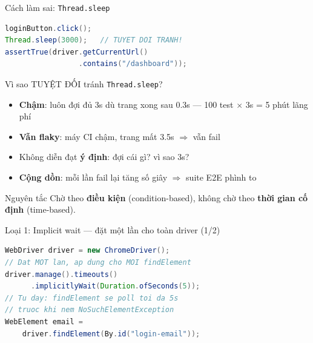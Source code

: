 \documentclass[aspectratio=169,12pt]{beamer}
\begin{document}
\begin{frame}[fragile]{Cách làm sai: \texttt{Thread.sleep}}
\begin{lstlisting}[language=Java]
loginButton.click();
Thread.sleep(3000);   // TUYET DOI TRANH!
assertTrue(driver.getCurrentUrl()
                 .contains("/dashboard"));
\end{lstlisting}

  \begin{alertblock}{Vì sao TUYỆT ĐỐI tránh \texttt{Thread.sleep}?}
    \small
    \begin{itemize}
      \item \textbf{Chậm}: luôn đợi đủ 3s dù trang xong sau 0.3s
            --- 100 test $\times$ 3s = 5 phút lãng phí
      \item \textbf{Vẫn flaky}: máy CI chậm, trang mất 3.5s
            $\Rightarrow$ vẫn fail
      \item Không diễn đạt \textbf{ý định}: đợi cái gì? vì sao 3s?
      \item \textbf{Cộng dồn}: mỗi lần fail lại tăng số giây
            $\Rightarrow$ suite E2E phình to
    \end{itemize}
  \end{alertblock}

  \begin{block}{Nguyên tắc}
    Chờ theo \textbf{điều kiện} (condition-based), không chờ theo
    \textbf{thời gian cố định} (time-based).
  \end{block}
\end{frame}

\begin{frame}[fragile]{Loại 1: Implicit wait --- đặt một lần cho toàn driver (1/2)}
\begin{lstlisting}[language=Java,basicstyle=\ttfamily\scriptsize]
WebDriver driver = new ChromeDriver();
// Dat MOT lan, ap dung cho MOI findElement
driver.manage().timeouts()
      .implicitlyWait(Duration.ofSeconds(5));
// Tu day: findElement se poll toi da 5s
// truoc khi nem NoSuchElementException
WebElement email =
    driver.findElement(By.id("login-email"));
\end{lstlisting}
\end{frame}
\end{document}
